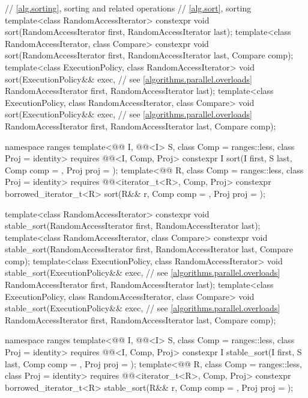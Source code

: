 \begin{codeblock}
{  // \ref{alg.sorting}, sorting and related operations
  // \ref{alg.sort}, sorting
  template<class RandomAccessIterator>
    constexpr void sort(RandomAccessIterator first, RandomAccessIterator last);
  template<class RandomAccessIterator, class Compare>
    constexpr void sort(RandomAccessIterator first, RandomAccessIterator last,
                        Compare comp);
  template<class ExecutionPolicy, class RandomAccessIterator>
    void sort(ExecutionPolicy&& exec,                           // see \ref{algorithms.parallel.overloads}
              RandomAccessIterator first, RandomAccessIterator last);
  template<class ExecutionPolicy, class RandomAccessIterator, class Compare>
    void sort(ExecutionPolicy&& exec,                           // see \ref{algorithms.parallel.overloads}
              RandomAccessIterator first, RandomAccessIterator last,
              Compare comp);

  namespace ranges {
    template<@@ I, @@<I> S, class Comp = ranges::less,
             class Proj = identity>
      requires @@<I, Comp, Proj>
      constexpr I
        sort(I first, S last, Comp comp = {}, Proj proj = {});
    template<@@ R, class Comp = ranges::less, class Proj = identity>
      requires @@<iterator_t<R>, Comp, Proj>
      constexpr borrowed_iterator_t<R>
        sort(R&& r, Comp comp = {}, Proj proj = {});
  }

  template<class RandomAccessIterator>
    constexpr void stable_sort(RandomAccessIterator first, RandomAccessIterator last);
  template<class RandomAccessIterator, class Compare>
    constexpr void stable_sort(RandomAccessIterator first, RandomAccessIterator last,
                     Compare comp);
  template<class ExecutionPolicy, class RandomAccessIterator>
    void stable_sort(ExecutionPolicy&& exec,                    // see \ref{algorithms.parallel.overloads}
                     RandomAccessIterator first, RandomAccessIterator last);
  template<class ExecutionPolicy, class RandomAccessIterator, class Compare>
    void stable_sort(ExecutionPolicy&& exec,                    // see \ref{algorithms.parallel.overloads}
                     RandomAccessIterator first, RandomAccessIterator last,
                     Compare comp);

  namespace ranges {
    template<@@ I, @@<I> S, class Comp = ranges::less,
             class Proj = identity>
      requires @@<I, Comp, Proj>
      constexpr I stable_sort(I first, S last, Comp comp = {}, Proj proj = {});
    template<@@ R, class Comp = ranges::less, class Proj = identity>
      requires @@<iterator_t<R>, Comp, Proj>
      constexpr borrowed_iterator_t<R>
        stable_sort(R&& r, Comp comp = {}, Proj proj = {});
  }

}
\end{codeblock}
